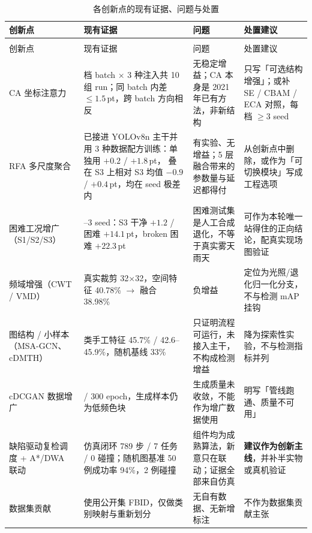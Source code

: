 \documentclass[UTF8,a4paper,11pt]{ctexart}
\begin{document}
\begin{footnotesize}
\begin{longtable}{@{}>{\raggedright\arraybackslash}p{2.15cm}
                     >{\raggedright\arraybackslash}p{3.95cm}
                     >{\raggedright\arraybackslash}p{4.05cm}
                     >{\raggedright\arraybackslash}p{3.45cm}@{}}
\caption{各创新点的现有证据、问题与处置}\label{tab:novelty}\\
\toprule
创新点 & 现有证据 & 问题 & 处置建议 \\
\midrule
\endfirsthead
\multicolumn{4}{@{}l}{\footnotesize 表~\thetable（续）}\\[2pt]
\toprule
创新点 & 现有证据 & 问题 & 处置建议 \\
\midrule
\endhead
\bottomrule
\endfoot
CA 坐标注意力
  & 3 档 batch × 3 种注入共 10 组 run；同 batch 内差 $\le 1.5$\,pt，跨 batch 方向相反
  & 无稳定增益；CA 本身是 2021 年已有方法，非新结构
  & 只写「可选结构增强」；或补 SE / CBAM / ECA 对照，每档 $\ge 3$ seed \\
RFA 多尺度聚合
  & 已接进 YOLOv8n 主干并用 3 种数据配方训练：单独用 $+0.2$ / $+1.8$\,pt，
    叠在 S3 上相对 S3 均值 $-0.9$ / $+0.4$\,pt，均在 seed 极差内
  & 有实验、无增益；5 层融合带来的参数量与延迟都得付
  & 从创新点中删除，或作为「可切换模块」写成工程选项 \\
困难工况增广（S1/S2/S3）
  & 2--3 seed：S3 干净 $+1.2$ / 困难 $+14.1$\,pt，broken 困难 $+22.3$\,pt
  & 困难测试集是人工合成退化，不等于真实雾天雨天
  & 可作为本轮唯一站得住的正向结论，配真实现场图验证 \\
频域增强（CWT / VMD）
  & 真实裁剪 32$\times$32，空间特征 40.78\% $\rightarrow$ 融合 38.98\%
  & 负增益
  & 定位为光照/退化归一化分支，不与检测 mAP 挂钩 \\
图结构 / 小样本（MSA-GCN、cDMTH）
  & 3 类手工特征 45.7\% / 42.6--45.9\%，随机基线 33\%
  & 只证明流程可运行，未接入主干，不构成检测增益
  & 降为探索性实验，不与检测指标并列 \\
cDCGAN 数据增广
  & 60 / 300 epoch，生成样本仍为低频色块
  & 生成质量未收敛，不能作为增广数据使用
  & 明写「管线跑通、质量不可用」 \\
缺陷驱动复检调度 + A*/DWA 联动
  & 仿真闭环 789 步 / 7 任务 / 0 碰撞；随机图基准 50 例成功率 94\%，2 例碰撞
  & 组件均为成熟算法，新意只在联动；证据全部来自仿真
  & \textbf{建议作为创新主线}，并补半实物或真机验证 \\
数据集贡献
  & 使用公开集 FBID，仅做类别映射与重新划分
  & 无自有数据、无新增标注
  & 不作为数据集贡献主张 \\
\end{longtable}
\end{footnotesize}
\end{document}
